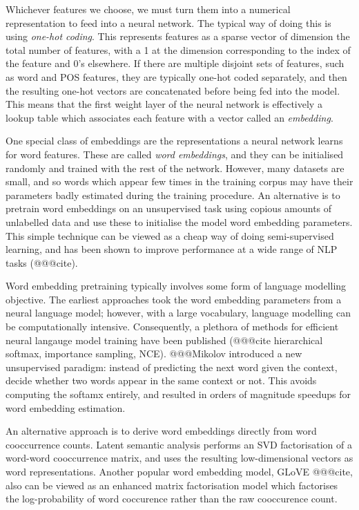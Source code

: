 Whichever features we choose, we must turn them into a numerical representation to feed into a neural network. The typical way of doing this is using \textit{one-hot coding}. This represents features as a sparse vector of dimension the total number of features, with a 1 at the dimension corresponding to the index of the feature and 0's elsewhere. If there are multiple disjoint sets of features, such as word and POS features, they are typically one-hot coded separately, and then the resulting one-hot vectors are concatenated before being fed into the model. This means that the first weight layer of the neural network is effectively a lookup table which associates each feature with a vector called an \textit{embedding}. 

One special class of embeddings are the representations a neural network learns for word features. These are called \textit{word embeddings}, and they can be initialised randomly and trained with the rest of the network. However, many datasets are small, and so words which appear few times in the training corpus may have their parameters badly estimated during the training procedure. An alternative is to pretrain word embeddings on an unsupervised task using copious amounts of unlabelled data and use these to initialise the model word embedding parameters. This simple technique can be viewed as a cheap way of doing semi-supervised learning, and has been shown to improve performance at a wide range of NLP tasks (@@@cite).

Word embedding pretraining typically involves some form of language modelling objective. The earliest approaches took the word embedding parameters from a neural language model; however, with a large vocabulary, language modelling can be computationally intensive. Consequently, a plethora of methods for efficient neural langauge model training have been published (@@@cite hierarchical softmax, importance sampling, NCE). @@@Mikolov introduced a new unsupervised paradigm: instead of predicting the next word given the context, decide whether two words appear in the same context or not. This avoids computing the softamx entirely, and resulted in orders of magnitude speedups for word embedding estimation.

An alternative approach is to derive word embeddings directly from word cooccurrence counts. Latent semantic analysis performs an SVD factorisation of a word-word cooccurrence matrix, and uses the resulting low-dimensional vectors as word representations. Another popular word embedding model, GLoVE @@@cite, also can be viewed as an enhanced matrix factorisation model which factorises the log-probability of word coccurence rather than the raw cooccurence count. 

